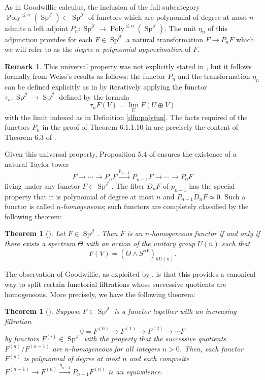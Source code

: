 \documentclass[reqno, oneside]{amsart}
\theoremstyle{definition}
\newtheorem{rmk}[nul]{Remark}
\theoremstyle{plain}
\newtheorem{thm}[nul]{Theorem}
\DeclareMathOperator{\Poly}{\text{Poly}}
\DeclareMathOperator{\Sp}{\text{Sp}}
\DeclareMathOperator{\J}{\mathcal{J}}
\begin{document}
As in Goodwillie calculus, the inclusion of the full subcategory $\Poly^{\leq n}(\Sp^{\J}) \subset \Sp^{\J}$ of functors which are polynomial of degree at most $n$ admits a left adjoint $P_n: \Sp^{\J} \to \Poly^{\leq n}(\Sp^{\J}).$  The unit $\eta_n$ of this adjunction provides for each $F\in \Sp^{\J}$ a natural transformation $F \to P_nF$ which we will refer to as the \emph{degree $n$ polynomial approximation} of $F$. 

\begin{rmk}\label{rmk:infinityweiss}
This universal property was not explicitly stated in \cite{Weiss}, but it follows formally from Weiss's results as follows: the functor $P_n$ and the transformation $\eta_n$ can be defined explicitly as in \cite{Weiss} by iteratively applying the functor $\tau_n: \Sp^{\J} \to \Sp^{\J}$ defined by the formula $$\tau_n F(V) = \lim_U F(U\oplus V)$$ with the limit indexed as in Definition \ref{dfn:polyfun}.   The facts required of the functors $P_n$ in the proof of Theorem 6.1.1.10 in \cite{HA} are precisely the content of Theorem 6.3 of \cite{Weiss}.  
\end{rmk}

Given this universal property, Proposition 5.4 of \cite{Weiss} ensures the existence of a natural Taylor tower $$F \longrightarrow \cdots \longrightarrow P_{n} F \xrightarrow{p_{n-1}} P_{n-1} F \longrightarrow \cdots \longrightarrow P_0F$$ living under any functor $F\in \Sp^{\J}.$  The fiber $D_n F$ of $p_{n-1}$ has the special property that it is polynomial of degree at most $n$ and $P_{n-1} D_n F \simeq 0$.  Such a functor is called \emph{$n$-homogeneous}; such functors are completely classified by the following theorem:

\begin{thm}[{{\cite[Theorem 7.3]{Weiss}}}]
Let $F\in \Sp^{\J}$.  Then $F$ is an $n$-homogeneous functor if and only if there exists a spectrum $\Theta$ with an action of the unitary group $U(n)$ such that $$F(V) = (\Theta \wedge S^{nV})_{hU(n)}.$$
\end{thm}

The observation of Goodwillie, as exploited by \cite{Arone}, is that this provides a canonical way to split certain functorial filtrations whose successive quotients are homogeneous.  More precisely, we have the following theorem:

\begin{thm}[\cite{Arone}]
Suppose $F \in \Sp^{\J}$ is a functor together with an increasing filtration $$0 = F^{(0)} \longrightarrow F^{(1)}\longrightarrow F^{(2)} \longrightarrow  \cdots F$$ by functors $F^{(i)}\in \Sp^{\J}$ with the property that the successive quotients $F^{(n)}/F^{(n-1)}$ are $n$-homogeneous for all integers $n>0$.  Then, each functor $F^{(n)}$ is polynomial of degree at most $n$ and each composite $F^{(n-1)} \longrightarrow F^{(n)} \xrightarrow{\eta_{n-1}} P_{n-1} F^{(n)}$ is an equivalence.
\end{thm}
\end{document}
